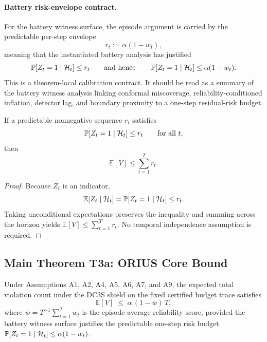\paragraph{Battery risk-envelope contract.}
For the battery witness surface, the episode argument is carried by the
predictable per-step envelope
\[
  r_t := \alpha(1-w_t),
\]
meaning that the instantiated battery analysis has justified
\[
  \operatorname{\mathbb{P}}[Z_t=1\mid\mathcal{H}_t] \le r_t
  \qquad\text{and hence}\qquad
  \operatorname{\mathbb{P}}[Z_t=1\mid\mathcal{H}_t] \le \alpha(1-w_t).
\]
This is a theorem-local calibration contract.  It should be read as a
summary of the battery witness analysis linking conformal miscoverage,
reliability-conditioned inflation, detector lag, and boundary proximity to a
one-step residual-risk budget.

\begin{lemma}
\label{lem:per-step-risk}
If a predictable nonnegative sequence $r_t$ satisfies
\[
  \operatorname{\mathbb{P}}[Z_t = 1 \mid \mathcal{H}_t] \le r_t
  \qquad\text{for all } t,
\]
then
\[
  \mathbb{E}[V] \le \sum_{t=1}^T r_t.
\]
\end{lemma}

\begin{proof}
Because $Z_t$ is an indicator,
\[
  \mathbb{E}[Z_t \mid \mathcal{H}_t]
  =
  \operatorname{\mathbb{P}}[Z_t=1 \mid \mathcal{H}_t]
  \le r_t.
\]
Taking unconditional expectations preserves the inequality and summing across
the horizon yields $\mathbb{E}[V] \le \sum_{t=1}^T r_t$.  No temporal
independence assumption is required.
\end{proof}

\subsection{Main Theorem T3a: ORIUS Core Bound}

\begin{theorem}
\label{thm:core-bound}
Under Assumptions A1, A2, A4, A5, A6, A7, and A9, the expected total violation
count under the DC3S shield on the fixed certified budget trace satisfies
\[
  \mathbb{E}[V] \;\le\; \alpha\,(1 - \bar{w})\,T,
\]
where $\bar{w} = T^{-1}\sum_{t=1}^T w_t$ is the episode-average
reliability score, provided the battery witness surface justifies the
predictable one-step risk budget
$\operatorname{\mathbb{P}}[Z_t=1\mid\mathcal{H}_t] \le \alpha(1-w_t)$.
\end{theorem}

